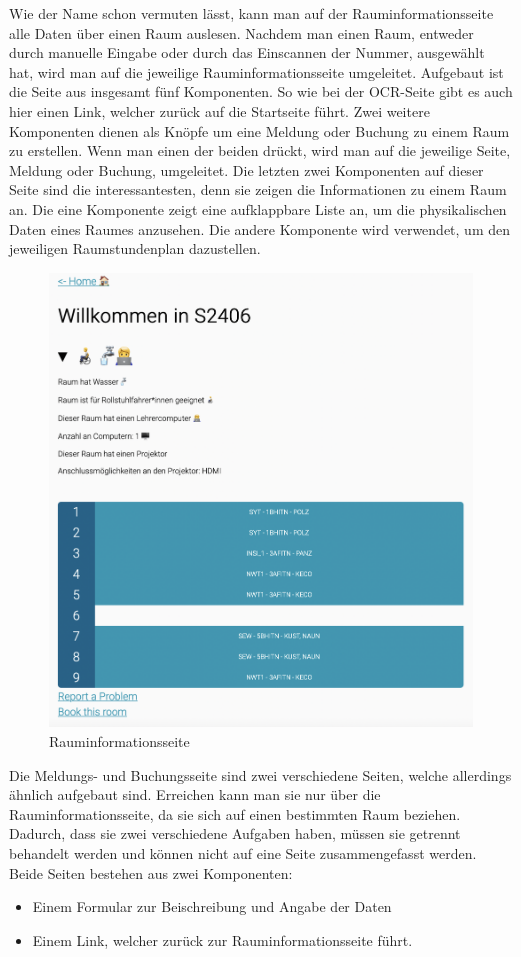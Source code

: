 Wie der Name schon vermuten lässt, kann man auf der Rauminformationsseite alle Daten über einen Raum auslesen. Nachdem man einen Raum, entweder durch manuelle Eingabe oder durch das Einscannen der Nummer, ausgewählt hat, wird man auf die jeweilige Rauminformationsseite umgeleitet. Aufgebaut ist die Seite aus insgesamt fünf Komponenten. So wie bei der OCR-Seite gibt es auch hier einen Link, welcher zurück auf die Startseite führt. Zwei weitere Komponenten dienen als Knöpfe um eine Meldung oder Buchung zu einem Raum zu erstellen. Wenn man einen der beiden drückt, wird man auf die jeweilige Seite, Meldung oder Buchung, umgeleitet. Die letzten zwei Komponenten auf dieser Seite sind die interessantesten, denn sie zeigen die Informationen zu einem Raum an. Die eine Komponente zeigt eine aufklappbare Liste an, um die physikalischen Daten eines Raumes anzusehen. Die andere Komponente wird verwendet, um den jeweiligen Raumstundenplan dazustellen.

\begin{figure}[H]
    \centering
    \includegraphics[width=120mm]{media/WebComponents/Rauminformationsseite.png}
    \caption{Rauminformationsseite}
\end{figure}


Die Meldungs- und Buchungsseite sind zwei verschiedene Seiten, welche allerdings ähnlich aufgebaut sind. Erreichen kann man sie nur über die Rauminformationsseite, da sie sich auf einen bestimmten Raum beziehen. Dadurch, dass sie zwei verschiedene Aufgaben haben, müssen sie getrennt behandelt werden und können nicht auf eine Seite zusammengefasst werden. Beide Seiten bestehen aus zwei Komponenten:
\begin{itemize}
    \item Einem Formular zur Beischreibung und Angabe der Daten
    \item Einem Link, welcher zurück zur Rauminformationsseite führt.
\end{itemize}

